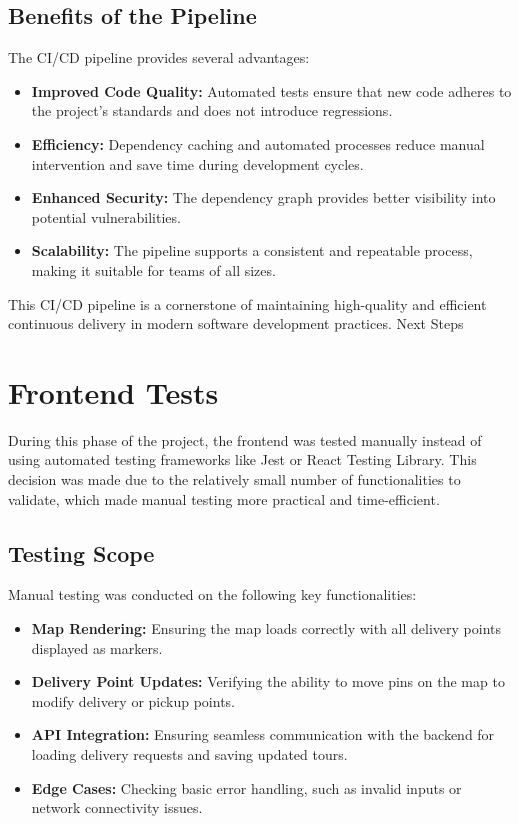 \documentclass[a4paper]{article}
\begin{document}
    
\subsection{Benefits of the Pipeline}

The CI/CD pipeline provides several advantages:
\begin{itemize}
    \item \textbf{Improved Code Quality:} Automated tests ensure that new code adheres to the project's standards and does not introduce regressions.
    \item \textbf{Efficiency:} Dependency caching and automated processes reduce manual intervention and save time during development cycles.
    \item \textbf{Enhanced Security:} The dependency graph provides better visibility into potential vulnerabilities.
    \item \textbf{Scalability:} The pipeline supports a consistent and repeatable process, making it suitable for teams of all sizes.
\end{itemize}
This CI/CD pipeline is a cornerstone of maintaining high-quality and efficient continuous delivery in modern software development practices.
Next Steps


\section{Frontend Tests}

During this phase of the project, the frontend was tested manually instead of using automated testing frameworks like Jest or React Testing Library. This decision was made due to the relatively small number of functionalities to validate, which made manual testing more practical and time-efficient.

\subsection{Testing Scope}
Manual testing was conducted on the following key functionalities:
\begin{itemize}
    \item \textbf{Map Rendering:} Ensuring the map loads correctly with all delivery points displayed as markers.
    \item \textbf{Delivery Point Updates:} Verifying the ability to move pins on the map to modify delivery or pickup points.
    \item \textbf{API Integration:} Ensuring seamless communication with the backend for loading delivery requests and saving updated tours.
    \item \textbf{Edge Cases:} Checking basic error handling, such as invalid inputs or network connectivity issues.
\end{itemize}
\end{document}
